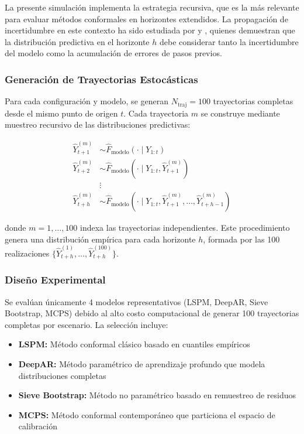 La presente simulación implementa la estrategia recursiva, que es la más relevante para evaluar métodos conformales en horizontes extendidos. La propagación de incertidumbre en este contexto ha sido estudiada por \textcite{Gneiting2014} y \textcite{Stankeviciute2021}, quienes demuestran que la distribución predictiva en el horizonte $h$ debe considerar tanto la incertidumbre del modelo como la acumulación de errores de pasos previos.

\subsubsection{Generación de Trayectorias Estocásticas}

Para cada configuración y modelo, se generan $N_{\text{traj}} = 100$ trayectorias completas desde el mismo punto de origen $t$. Cada trayectoria $m$ se construye mediante muestreo recursivo de las distribuciones predictivas:

\begin{equation}
\begin{aligned}
\hat{Y}_{t+1}^{(m)} & \sim \hat{F}_{\text{modelo}}(\cdot \mid Y_{1:t}) \\
\hat{Y}_{t+2}^{(m)} & \sim \hat{F}_{\text{modelo}}(\cdot \mid Y_{1:t}, \hat{Y}_{t+1}^{(m)}) \\
& \vdots \\
\hat{Y}_{t+h}^{(m)} & \sim \hat{F}_{\text{modelo}}\left(\cdot \mid Y_{1:t}, \hat{Y}_{t+1}^{(m)}, \ldots, \hat{Y}_{t+h-1}^{(m)}\right)
\end{aligned}
\end{equation}

donde $m = 1, \ldots, 100$ indexa las trayectorias independientes. Este procedimiento genera una distribución empírica para cada horizonte $h$, formada por las 100 realizaciones $\{\hat{Y}_{t+h}^{(1)}, \ldots, \hat{Y}_{t+h}^{(100)}\}$.

\subsubsection{Diseño Experimental}

Se evalúan únicamente 4 modelos representativos (LSPM, DeepAR, Sieve Bootstrap, MCPS) debido al alto costo computacional de generar 100 trayectorias completas por escenario. La selección incluye:

\begin{itemize}
\item \textbf{LSPM:} Método conformal clásico basado en cuantiles empíricos
\item \textbf{DeepAR:} Método paramétrico de aprendizaje profundo que modela distribuciones completas
\item \textbf{Sieve Bootstrap:} Método no paramétrico basado en remuestreo de residuos
\item \textbf{MCPS:} Método conformal contemporáneo que particiona el espacio de calibración
\end{itemize}

